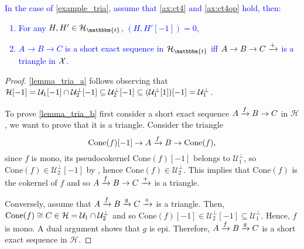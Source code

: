 \begin{lemma}\label{lemma_tria}
\textcolor{blue}{  In the case of \ref{example_tria}, assume that \ref{ax:ct4} and \ref{ax:ct4op} hold, then:
  \begin{enumerate}
    \item\label{lemma_tria_a} For any $H,H'\in\clH_\mathbbm{t}$, $(H,H'[-1])=0$,
    \item\label{lemma_tria_b} $A\to B\to C$ is a short exact sequence in $\mathcal{H}_\mathbbm{t}$ iff $A\to B\to C\xrightarrow{+}$ is
    a triangle in $\mathcal{X}$.
  \end{enumerate}}
\end{lemma}

\begin{proof}
  \ref{lemma_tria_a} follows observing that
  $\mathcal{H}[-1]=\mathcal{U}_1[-1]\cap\mathcal{U}_2^\perp[-1]\subseteq \mathcal{U}_2^\perp[-1]\subseteq(\mathcal{U}_1^\perp[1])[-1]=\mathcal{U}_1^\perp$.

  To prove \ref{lemma_tria_b} first consider a short exact sequence $A\xrightarrow{f} B\to C$ in $\mathcal{H}$, we want to
  prove that it is a triangle. Consider the triangle
  \begin{equation*}
    \mathrm{Cone}(f)[-1]\to A\xrightarrow{f} B \to \mathrm{Cone}(f),
  \end{equation*}
  since $f$ is mono, its pseudocokernel $\mathrm{Cone}(f)[-1]$ belongs to $\mathcal{U}_1^\perp$, so
  $\mathrm{Cone}(f)\in\mathcal{U}_2^\perp[-1]$ by \triangb, hence $\mathrm{Cone}(f)\in\mathcal{U}_2^\perp$.
  This implies that $\mathrm{Cone}(f)$ is the cokernel of $f$ and so $A\xrightarrow{f} B\to C\xrightarrow{+}$ is a triangle.

  Conversely, assume that $A\xrightarrow{f} B\xrightarrow{g} C\xrightarrow{+}$ is a triangle. Then, $\mathrm{Cone}(f)\cong C\in\mathcal{H}=\mathcal{U}_1\cap\mathcal{U}_2^\perp$ and
  so $\mathrm{Cone}(f)[-1]\in\mathcal{U}_2^\perp[-1]\subseteq \mathcal{U}_1^\perp$. Hence, $f$ is mono. A dual argument
  shows that $g$ is epi. Therefore, $A\xrightarrow{f} B\xrightarrow{g} C$ is a short exact sequence in $\mathcal{H}$.
\end{proof}

